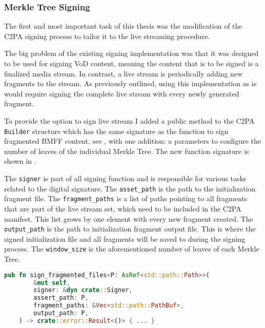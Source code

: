 \subsubsection{Merkle Tree Signing\label{sec:merkle_opt}}

The first and most important task of this thesis was the modification of the C2PA signing process to tailor it to the live streaming procedure.

The big problem of the existing signing implementation was that it was designed to be used for signing VoD content, meaning the content that is to be signed is a finalized media stream. In contrast, a live stream is periodically adding new fragments to the stream. As previously outlined, using this implementation as is would require signing the complete live stream with every newly generated fragment.

To provide the option to sign live stream I added a public method to the C2PA \texttt{Builder} structure which has the same signature as the function to sign fragmented BMFF content, see , with one addition: a parameters to configure the number of leaves of the individual Merkle Tree. The new function signature is shown in .

The \texttt{signer} is part of all signing function and is responsible for various tasks related to the digital signature. The \texttt{asset\_path} is the path to the initialization fragment file. The \texttt{fragment\_paths} is a list of paths pointing to all fragments that are part of the live stream set, which need to be included in the C2PA manifest. This list grows by one element with every new fragment created. The \texttt{output\_path} is the path to initialization fragment output file. This is where the signed initialization file and all fragments will be saved to during the signing process. The \texttt{window\_size} is the aforementioned number of leaves of each Merkle Tree. 

\begin{minipage}{0.95\linewidth}
\begin{lstlisting}[caption={Original Signing Function}, label=code:fragment_bmff, language=Rust, captionpos=b]
    pub fn sign_fragmented_files<P: AsRef<std::path::Path>>(
        &mut self,
        signer: &dyn crate::Signer,
        assert_path: P,
        fragment_paths: &Vec<std::path::PathBuf>,
        output_path: P,
    ) -> crate::error::Result<()> { ... }
\end{lstlisting}
\end{minipage}

